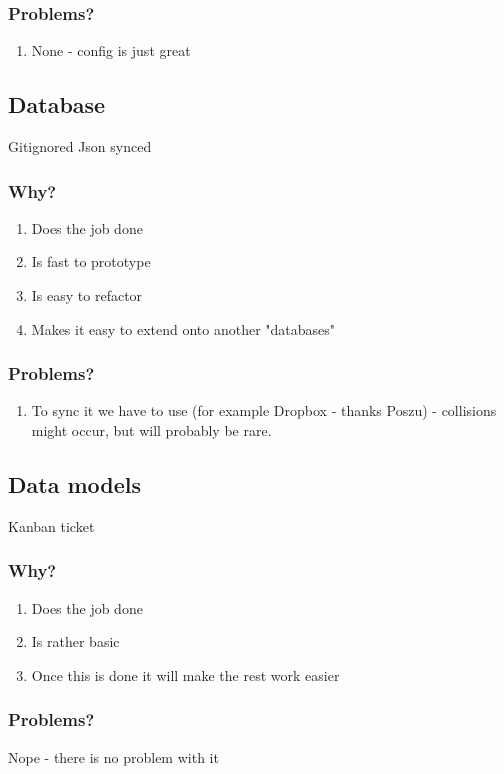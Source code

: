 \subsubsection{Problems?}
\begin{enumerate}
    \item None - config is just great
\end{enumerate}
\subsection{Database}\label{DB:POC}
Gitignored Json synced
\subsubsection{Why?}
\begin{enumerate}
    \item Does the job done
    \item Is fast to prototype
    \item Is easy to refactor
    \item Makes it easy to extend onto another "databases"
\end{enumerate}
\subsubsection{Problems?}
\begin{enumerate}
    \item To sync it we have to use (for example Dropbox - thanks Poszu) - collisions might occur, but will probably be rare.
\end{enumerate}

\subsection{Data models}\label{MODEL:POC}
Kanban ticket
\subsubsection{Why?}
\begin{enumerate}
    \item Does the job done
    \item Is rather basic
    \item Once this is done it will make the rest work easier
\end{enumerate}
\subsubsection{Problems?}
Nope - there is no problem with it
